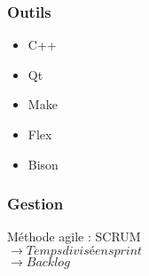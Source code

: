 \begin{frame}
\frametitle{Outils}
\begin{itemize}
\item C++
\item Qt
\item Make
\item Flex 
\item Bison
\end{itemize}
\end{frame}

\begin{frame}
\frametitle{Gestion}
Méthode agile : SCRUM\\
$\rightarrow Temps divisé en sprint$\\
$\rightarrow Backlog$
\end{frame}
